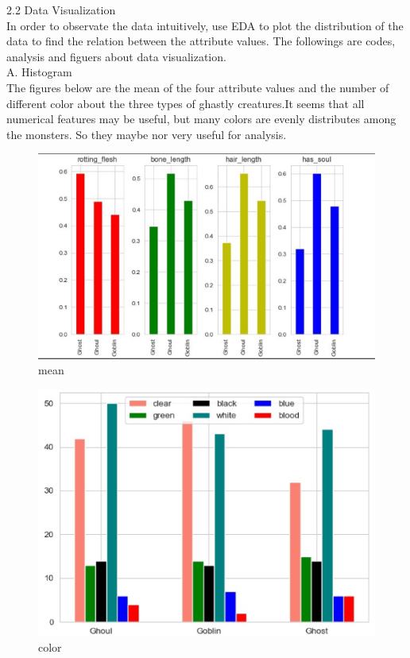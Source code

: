 \hspace*{0.1cm}2.2 Data Visualization\\
\hspace*{0.4cm}In order to observate the data intuitively, use EDA to plot the distribution of the data to find the relation between the attribute values. The followings are codes, analysis and figuers about data visualization.\\
\hspace*{0.4cm}A. Histogram\\
\hspace*{0.4cm}The figures below are the mean of the four attribute values  and the number of different color about the three types of ghastly creatures.It seems that all numerical features may be useful, but many colors are evenly distributes among the monsters. So they maybe nor very useful for analysis.\\
\begin{figure}[htbp]\centering
	\includegraphics[scale=0.3]{2.eps}
	\caption{mean}
\end{figure}
\begin{figure}[htbp]\centering
	\includegraphics[scale=0.3]{3.eps}
	\caption{color}
\end{figure}


